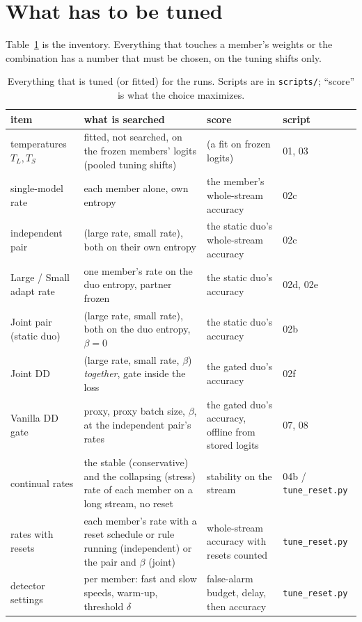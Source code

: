 \documentclass[10pt]{article}
\newcommand{\rl}[1]{\texttt{#1}}
\begin{document}
\section{What has to be tuned}\label{sec:inventory}
Table~\ref{tab:inventory} is the inventory. Everything that touches a member's weights or the combination has a number that must be chosen, on the tuning shifts only.

\begin{table}[!t]
  \centering\small
  \caption{Everything that is tuned (or fitted) for the runs. Scripts are in \rl{scripts/}; ``score'' is what the choice maximizes.}
  \label{tab:inventory}
  \begin{tabular}{@{}l p{4.0cm} p{4.4cm} l@{}}
    \toprule
    item & what is searched & score & script \\
    \midrule
    temperatures \(T_L, T_S\) & fitted, not searched, on the frozen members' logits (pooled tuning shifts) & (a fit on frozen logits) & 01, 03 \\
    single-model rate & each member alone, own entropy & the member's whole-stream accuracy & 02c \\
    independent pair & (large rate, small rate), both on their own entropy & the static duo's whole-stream accuracy & 02c \\
    Large / Small adapt rate & one member's rate on the duo entropy, partner frozen & the static duo's accuracy & 02d, 02e \\
    Joint pair (static duo) & (large rate, small rate), both on the duo entropy, \(\beta=0\) & the static duo's accuracy & 02b \\
    Joint DD & (large rate, small rate, \(\beta\)) \emph{together}, gate inside the loss & the gated duo's accuracy & 02f \\
    Vanilla DD gate & proxy, proxy batch size, \(\beta\), at the independent pair's rates & the gated duo's accuracy, offline from stored logits & 07, 08 \\
    continual rates & the stable (conservative) and the collapsing (stress) rate of each member on a long stream, no reset & stability on the stream & 04b / \rl{tune\_reset.py} \\
    rates with resets & each member's rate with a reset schedule or rule running (independent) or the pair and \(\beta\) (joint) & whole-stream accuracy with resets counted & \rl{tune\_reset.py} \\
    detector settings & per member: fast and slow speeds, warm-up, threshold \(\delta\) & false-alarm budget, delay, then accuracy & \rl{tune\_reset.py} \\
    \bottomrule
  \end{tabular}
\end{table}
\end{document}
